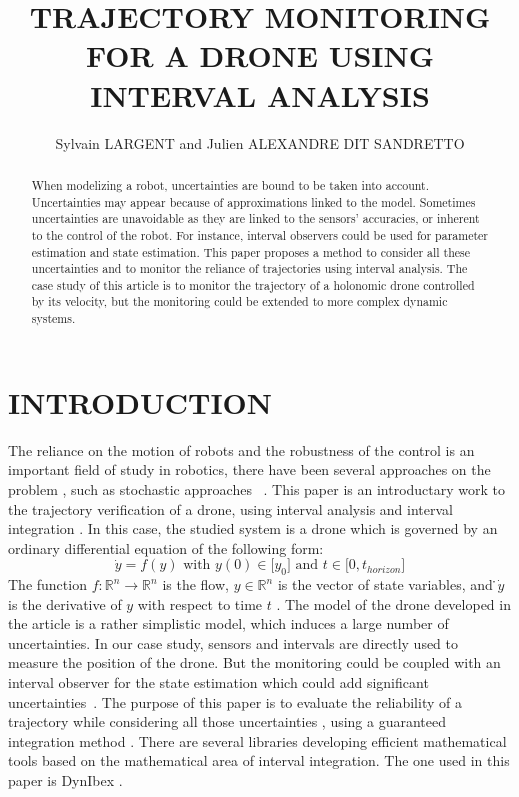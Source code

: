 \documentclass[letterpaper, 10 pt, conference]{ieeeconf}  %
\title{\LARGE \bf
    TRAJECTORY MONITORING FOR A DRONE USING INTERVAL ANALYSIS
}
\author{Sylvain LARGENT and Julien ALEXANDRE DIT SANDRETTO}
\begin{document}
\maketitle
\thispagestyle{empty}
\pagestyle{empty}

\begin{abstract}
When modelizing a robot, uncertainties are bound to be taken into account. Uncertainties may appear because of approximations linked to the model. Sometimes uncertainties are unavoidable as they are linked to the sensors' accuracies, or inherent to the control of the robot. For instance, interval observers could be used for parameter estimation and state estimation. This paper proposes a method to consider all these uncertainties and to monitor the reliance of trajectories using interval analysis. The case study of this article is to monitor the trajectory of a holonomic drone controlled by its velocity, but the monitoring could be extended to more complex dynamic systems.

\end{abstract}


\section{INTRODUCTION}
The reliance on the motion of robots and the robustness of the control is an important field of study in robotics, there have been several approaches on the problem \cite{Reliabilty,Quadrotors Observer,Robust,Hybrid}, such as stochastic approaches ~\cite{Markov,Signal}. 
This paper is an introductary work to the trajectory verification of a drone, using interval analysis and interval integration \cite{Moore66,Jaulin}. In this case, the studied system is a drone which is governed by an ordinary differential equation of the following form:
\begin{equation}
    \dot{y} = f(y) \text{ with } y(0) \in \lbrack y_{0} \rbrack \text{ and } t \in \lbrack 0,t_{horizon} \rbrack
\end{equation}
The function $f : \mathbb{R}^{n} \rightarrow \mathbb{R}^{n}$ is the flow, $y \in \mathbb{R}^{n}$ is the vector of state variables, and  ̇$\dot{y}$ is the derivative of $y$ with respect to time $t$ \cite{Sandretto}.
The model of the drone developed in the article is a rather simplistic model, which induces a large number of uncertainties. In our case study, sensors and intervals are directly used to measure the position of the drone. But the monitoring could be coupled with an interval observer for the state estimation which could add significant uncertainties~\cite{Quadrotors Observer,observer}. The purpose of this paper is to evaluate the reliability of a trajectory while considering all those uncertainties \cite{Robust}, using a guaranteed integration method \cite{Guaranteed,Sandretto}. There are several libraries developing efficient mathematical tools based on the mathematical area of interval integration. The one used in this paper is DynIbex \cite{Sandretto}.\\
\end{document}
